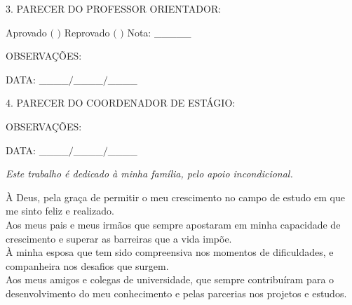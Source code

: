\begin{folhadeaprovacao}
  		\ABNTEXchapterfont\large   3. PARECER DO PROFESSOR ORIENTADOR:
  		\normalsize 
  		
  		Aprovado $($ \tab $)$ \tab \tab Reprovado $($ \tab $)$  \tab \tab Nota: \_\_\_\_\_
  		
  	 OBSERVAÇÕES:
  		  		
  		  		 DATA: \_\_\_\_$/$\_\_\_\_$/$\_\_\_\_ \tab {}
  		\par
  		\vspace*{0.5cm}
  		 \ABNTEXchapterfont\large   4. PARECER DO COORDENADOR DE ESTÁGIO:
  		   		\normalsize 
  		
  		 OBSERVAÇÕES: 

  		 DATA: \_\_\_\_$/$\_\_\_\_$/$\_\_\_\_ \tab {}
  		 
   \begin{center}
    \vspace*{0.1cm}
    {\large\imprimirlocal}
    \par
    {\large\imprimirdata}
    \vspace*{0.5cm}
  \end{center}
  
\end{folhadeaprovacao}

\begin{dedicatoria}
   \vspace*{\fill}
   \centering
   \noindent
   \textit{ Este trabalho é dedicado à minha família, pelo apoio incondicional.} \vspace*{\fill}
\end{dedicatoria}

\begin{agradecimentos}
À Deus, pela graça de permitir o meu crescimento no campo de estudo em que me sinto feliz e realizado. \\

Aos meus pais e meus irmãos que sempre apostaram em minha capacidade de crescimento e superar as barreiras que a vida impõe.\\

À minha esposa que tem sido compreensiva nos momentos de dificuldades, e companheira nos desafios que surgem.\\

Aos meus amigos e colegas de universidade, que sempre contribuíram para o desenvolvimento do meu conhecimento e pelas parcerias nos projetos e estudos.


\end{agradecimentos}

